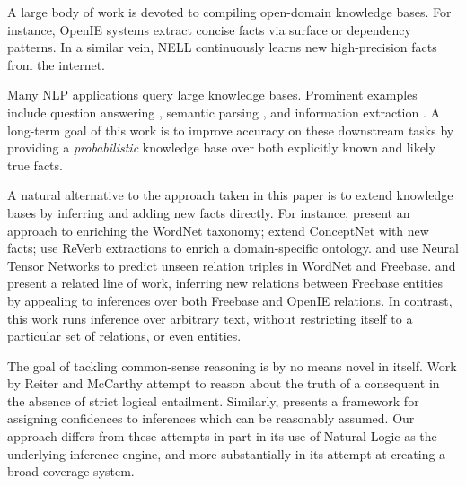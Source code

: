 A large body of work is devoted to compiling open-domain knowledge
  bases.
For instance, OpenIE systems
  \cite{key:2007yates-textrunner,key:2011fader-reverb,key:2012mausam-ollie}
  extract concise facts via surface or dependency patterns.
In a similar vein, NELL \cite{key:2010carlson-nell,key:2013gardnerpra-nell}
  continuously learns new high-precision facts from the internet.

Many NLP applications query large knowledge bases.
Prominent examples include
  question answering
    \cite{key:2001voorhees-trec},
  semantic parsing
    \cite{key:1996zelle-semantics,key:2007zettlemoyer-semantics,key:2013kwiatkowski-semantics,key:2014berant-semantics},
  and information extraction
    \cite{key:2011hoffman-kbp,key:2012surdeanu-mimlre}.
A long-term goal of this work is to improve accuracy on these
  downstream tasks by providing a \textit{probabilistic} knowledge base
  over both explicitly known and likely true facts.

A natural alternative to the approach taken in this paper is to
  extend knowledge bases by inferring and adding new facts directly.
For instance,
   present an approach to enriching 
    the WordNet taxonomy;
   extend ConceptNet with new facts;
   use ReVerb extractions to 
    enrich a domain-specific ontology.
 and 
  use Neural Tensor Networks to predict unseen relation triples in
  WordNet and Freebase.
 and 
  present a related line of work, inferring new relations between
  Freebase entities by appealing to inferences over both Freebase and
  OpenIE relations.
In contrast, this work runs inference over arbitrary text, without 
  restricting itself to a particular set of relations, or even entities.


The goal of tackling common-sense reasoning is by no means novel in
  itself.
Work by Reiter and McCarthy \cite{key:1980reiter-logic,key:1980mccarthy-circumscription}
  attempt to reason about the truth of a consequent
  in the absence of strict logical entailment.
Similarly,  presents a framework for
  assigning confidences to inferences which can be reasonably assumed.
Our approach differs from these attempts in part in its use of Natural Logic
  as the underlying inference engine, and more substantially in its
  attempt at creating a broad-coverage system.

